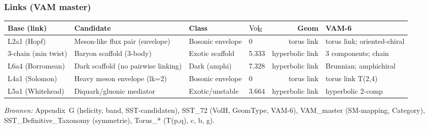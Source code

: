 \begin{landscape}
\subsubsection*{Links (VAM master)}
\begin{tabular}{@{}llllrl@{}}
\toprule
Base (link) & Candidate & Class & $\operatorname{Vol}_{\!\mathbb{H}}$ & Geom & VAM-6 \\
\midrule
L2a1 (Hopf) & Meson-like flux pair (envelope) & Bosonic envelope & 0 & torus link & torus link; oriented-chiral \\
3-chain (min twist) & Baryon scaffold (3-body) & Exotic scaffold & 5.333 & hyperbolic link & 3 components; chain \\
L6a4 (Borromean) & Dark scaffold (no pairwise linking) & Dark (amphi) & 7.328 & hyperbolic link & Brunnian; amphichiral \\
L4a1 (Solomon) & Heavy meson envelope (lk=2) & Bosonic envelope & 0 & torus link & torus link T(2,4) \\
L5a1 (Whitehead) & Diquark/gluonic mediator & Exotic/unstable & 3.664 & hyperbolic link & hyperbolic 2-comp \\
\bottomrule
\end{tabular}

\end{landscape}
\noindent\textit{Bronnen:} Appendix~G (helicity, band, SST-candidaten), SST\_72 (VolH, GeomType, VAM-6), VAM\_master (SM-mapping, Category), SST\_Definitive\_Taxonomy (symmetrie), Torus\_* (T(p,q), c, b, g).
